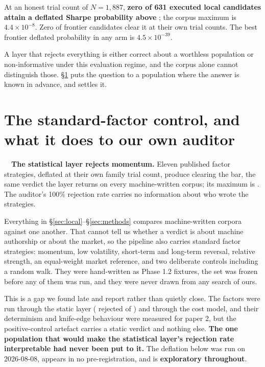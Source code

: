 \documentclass[11pt,a4paper]{article}
\begin{document}
At an honest trial count of $N=1{,}887$, \textbf{zero of 631 executed local candidates attain a
deflated Sharpe probability above \aaGvBar{}}; the corpus maximum is $4.4\times10^{-8}$. Zero of
\aaGvTotal{} frontier candidates clear it at their own trial counts. The best frontier deflated
probability in any arm is $4.5\times10^{-39}$.

A layer that rejects everything is either correct about a worthless population or non-informative
under this evaluation regime, and the corpus alone cannot distinguish those. \S\ref{sec:factors}
puts the question to a population where the answer is known in advance, and settles it.

\section{The standard-factor control, and what it does to our own auditor}
\label{sec:factors}

\begin{finding}
\tagexpl\ \ \textbf{The statistical layer rejects momentum.} Eleven published factor strategies,
deflated at their own family trial count, produce \sfCleared{} clearing the \sfBar{} bar, the same
verdict the layer returns on every machine-written corpus; its maximum is \sfMaxDsr{}. The
auditor's 100\% rejection rate carries no information about who wrote the strategies.
\end{finding}

Everything in \S\ref{sec:local}--\S\ref{sec:methods} compares machine-written corpora against one
another. That cannot tell us whether a verdict is about machine authorship or about the market, so
the pipeline also carries \sfN{} standard factor strategies: momentum, low volatility,
short-term and long-term reversal, relative strength, an equal-weight market reference, and two
deliberate controls including a random walk. They were hand-written as Phase 1.2 fixtures, the set
was frozen before any of them was run, and they were never drawn from any search of ours.

\begin{selfreport}[title={They had never been shown to the statistical layer at all}]
This is a gap we found late and report rather than quietly close. The factors were run through the
static layer (\sfStatic{} rejected of \sfN{}) and through the cost model, and their determinism and
knife-edge behaviour were measured for paper 2, but the positive-control artefact carries a
static verdict and nothing else. \textbf{The one population that would make the statistical layer's
rejection rate interpretable had never been put to it.} The deflation below was run on 2026-08-08,
appears in no pre-registration, and is \textbf{exploratory throughout}.
\end{selfreport}
\end{document}
